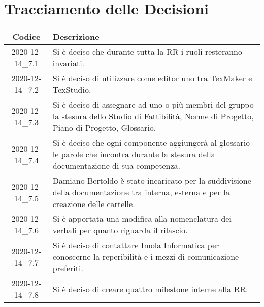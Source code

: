 \section*{Tracciamento delle Decisioni}

\begin{center}
	\begin{longtable}{|c|p{13cm}|}
	\hline
	\rowcolor{lighter-grayer}
	\textbf{Codice} & \textbf{Descrizione} \\
	\hline
	\endfirsthead

	
	2020-12-14\_7.1 & Si è deciso che durante tutta la RR i ruoli resteranno invariati. \\
	\hline
	2020-12-14\_7.2 & Si è deciso di utilizzare come editor \glock{\LaTeX} uno tra TexMaker e TexStudio. \\
	\hline
	2020-12-14\_7.3 & Si è deciso di assegnare ad uno o più membri del gruppo la stesura dello Studio di Fattibilità, Norme di Progetto, Piano di Progetto, Glossario.  \\
	\hline
	2020-12-14\_7.4 & Si è deciso che ogni componente aggiungerà al glossario le parole che incontra durante la stesura della documentazione di sua competenza.  \\
	\hline
	2020-12-14\_7.5 & Damiano Bertoldo è stato incaricato per la suddivisione della documentazione tra interna, esterna e per la creazione delle cartelle.  \\
	\hline
	2020-12-14\_7.6 & Si è apportata una modifica alla nomenclatura dei verbali per quanto riguarda il rilascio. \\
	\hline
	2020-12-14\_7.7 & Si è deciso di contattare Imola Informatica per conoscerne la reperibilità e i mezzi di comunicazione preferiti.  \\
	\hline
	2020-12-14\_7.8 & Si è deciso di creare quattro milestone interne alla RR.  \\
	\hline
	

	\end{longtable}
\end{center}
